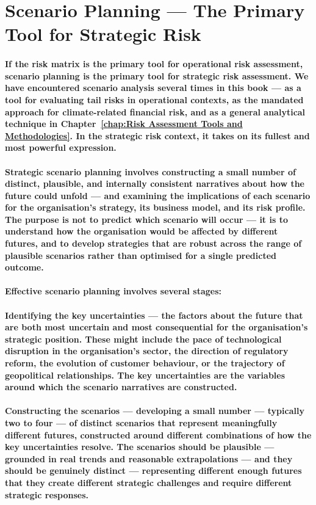 \section{Scenario Planning — The Primary Tool for Strategic Risk}
\paragraph{If the risk matrix is the primary tool for operational risk assessment, scenario planning is the primary tool for strategic risk assessment. We have encountered scenario analysis several times in this book — as a tool for evaluating tail risks in operational contexts, as the mandated approach for climate-related financial risk, and as a general analytical technique in Chapter~\ref{chap:Risk Assessment Tools and Methodologies}. In the strategic risk context, it takes on its fullest and most powerful expression.}
\paragraph{\textbf{Strategic scenario planning} involves constructing a small number of distinct, plausible, and internally consistent narratives about how the future could unfold — and examining the implications of each scenario for the organisation's strategy, its business model, and its risk profile. The purpose is not to predict which scenario will occur — it is to understand how the organisation would be affected by different futures, and to develop strategies that are robust across the range of plausible scenarios rather than optimised for a single predicted outcome.}
\paragraph{Effective scenario planning involves several stages:}
\paragraph{\textbf{Identifying the key uncertainties} — the factors about the future that are both most uncertain and most consequential for the organisation's strategic position. These might include the pace of technological disruption in the organisation's sector, the direction of regulatory reform, the evolution of customer behaviour, or the trajectory of geopolitical relationships. The key uncertainties are the variables around which the scenario narratives are constructed.}
\paragraph{\textbf{Constructing the scenarios} — developing a small number — typically two to four — of distinct scenarios that represent meaningfully different futures, constructed around different combinations of how the key uncertainties resolve. The scenarios should be plausible — grounded in real trends and reasonable extrapolations — and they should be genuinely distinct — representing different enough futures that they create different strategic challenges and require different strategic responses.}
